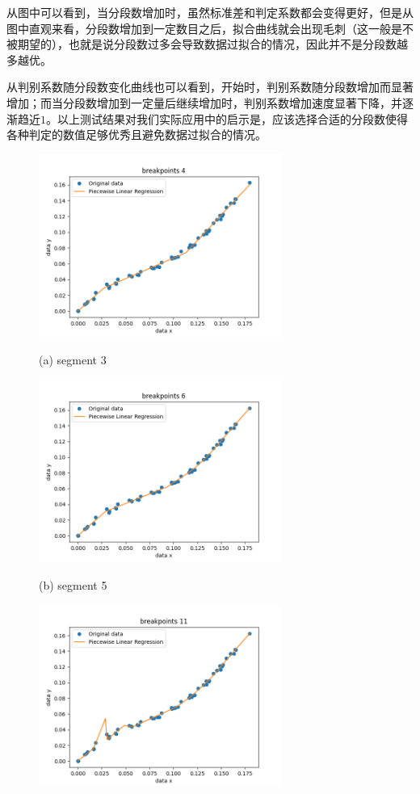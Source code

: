 从图中可以看到，当分段数增加时，虽然标准差和判定系数都会变得更好，但是从图中直观来看，分段数增加到一定数目之后，拟合曲线就会出现毛刺（这一般是不被期望的），也就是说分段数过多会导致数据过拟合的情况，因此并不是分段数越多越优。

从判别系数随分段数变化曲线也可以看到，开始时，判别系数随分段数增加而显著增加；而当分段数增加到一定量后继续增加时，判别系数增加速度显著下降，并逐渐趋近$1$。以上测试结果对我们实际应用中的启示是，应该选择合适的分段数使得各种判定的数值足够优秀且避免数据过拟合的情况。

\begin{figure}[H]
    \begin{minipage}{0.48\linewidth}
      \centerline{\includegraphics[width=8.0cm]{./figure/chapter6/test3/segment03.png}}
      \centerline{(a) segment 3}
    \end{minipage}
    \hfill
    \begin{minipage}{.48\linewidth}
      \centerline{\includegraphics[width=8.0cm]{./figure/chapter6/test3/segment05.png}}
      \centerline{(b) segment 5}
    \end{minipage}
    \vfill
    \begin{minipage}{0.48\linewidth}
      \centerline{\includegraphics[width=8.0cm]{./figure/chapter6/test3/segment10.png}}

\end{minipage}
\end{figure}
